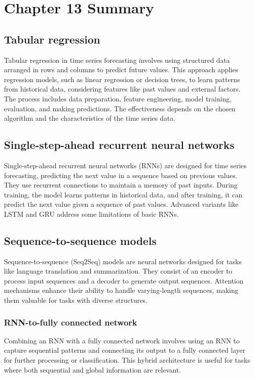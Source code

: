 \documentclass{article}
\begin{document}
\section{Chapter 13 Summary}

\subsection{Tabular regression}
Tabular regression in time series forecasting involves using structured data arranged in rows and columns to predict future values. This approach applies regression models, such as linear regression or decision trees, to learn patterns from historical data, considering features like past values and external factors. The process includes data preparation, feature engineering, model training, evaluation, and making predictions. The effectiveness depends on the chosen algorithm and the characteristics of the time series data.

\subsection{Single-step-ahead recurrent neural networks}
Single-step-ahead recurrent neural networks (RNNs) are designed for time series forecasting, predicting the next value in a sequence based on previous values. They use recurrent connections to maintain a memory of past inputs. During training, the model learns patterns in historical data, and after training, it can predict the next value given a sequence of past values. Advanced variants like LSTM and GRU address some limitations of basic RNNs.

\subsection{Sequence-to-sequence models}
Sequence-to-sequence (Seq2Seq) models are neural networks designed for tasks like language translation and summarization. They consist of an encoder to process input sequences and a decoder to generate output sequences. Attention mechanisms enhance their ability to handle varying-length sequences, making them valuable for tasks with diverse structures.
\subsubsection{RNN-to-fully connected network}
Combining an RNN with a fully connected network involves using an RNN to capture sequential patterns and connecting its output to a fully connected layer for further processing or classification. This hybrid architecture is useful for tasks where both sequential and global information are relevant.
\end{document}
